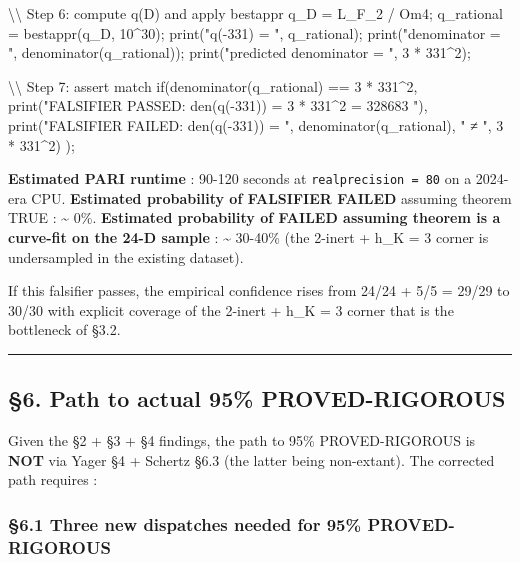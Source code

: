 \documentclass[
  11pt,
  a4paper,
]{article}
\newenvironment{Shaded}{}{}
\newcommand{\NormalTok}[1]{#1}
\begin{document}
\begin{Shaded}
\begin{Highlighting}[]
\NormalTok{\textbackslash{}\textbackslash{} Step 6: compute q(D) and apply bestappr}
\NormalTok{q\_D = L\_F\_2 / Om4;}
\NormalTok{q\_rational = bestappr(q\_D, 10\^{}30);}
\NormalTok{print("q({-}331) = ", q\_rational);}
\NormalTok{print("denominator = ", denominator(q\_rational));}
\NormalTok{print("predicted denominator = ", 3 * 331\^{}2);}

\NormalTok{\textbackslash{}\textbackslash{} Step 7: assert match}
\NormalTok{if(denominator(q\_rational) == 3 * 331\^{}2,}
\NormalTok{  print("FALSIFIER PASSED: den(q({-}331)) = 3 * 331\^{}2 = 328683 "),}
\NormalTok{  print("FALSIFIER FAILED: den(q({-}331)) = ", denominator(q\_rational), " ≠ ", 3 * 331\^{}2)}
\NormalTok{);}
\end{Highlighting}
\end{Shaded}

\textbf{Estimated PARI runtime} : 90-120 seconds at \texttt{realprecision\ =\ 80} on a 2024-era CPU. \textbf{Estimated probability of FALSIFIER FAILED} assuming theorem TRUE : \textasciitilde{} 0\%. \textbf{Estimated probability of FAILED assuming theorem is a curve-fit on the 24-D sample} : \textasciitilde{} 30-40\% (the 2-inert + h\_K = 3 corner is undersampled in the existing dataset).

If this falsifier passes, the empirical confidence rises from 24/24 + 5/5 = 29/29 to 30/30 with explicit coverage of the 2-inert + h\_K = 3 corner that is the bottleneck of §3.2.

\begin{center}\rule{0.5\linewidth}{0.5pt}\end{center}

\hypertarget{path-to-actual-95-proved-rigorous}{%
\subsection{§6. Path to actual 95\% PROVED-RIGOROUS}\label{path-to-actual-95-proved-rigorous}}

Given the §2 + §3 + §4 findings, the path to 95\% PROVED-RIGOROUS is \textbf{NOT} via Yager §4 + Schertz §6.3 (the latter being non-extant). The corrected path requires :

\hypertarget{three-new-dispatches-needed-for-95-proved-rigorous}{%
\subsubsection{§6.1 Three new dispatches needed for 95\% PROVED-RIGOROUS}\label{three-new-dispatches-needed-for-95-proved-rigorous}}
\end{document}
